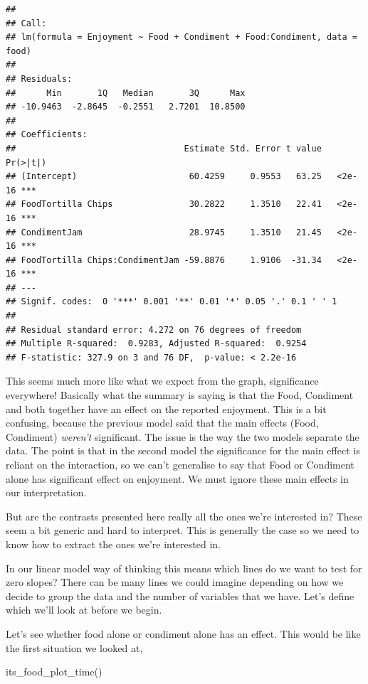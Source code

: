 \documentclass[
]{book}
\newenvironment{Shaded}{\begin{snugshade}}{\end{snugshade}}
\newcommand{\FunctionTok}[1]{\textcolor[rgb]{0.00,0.00,0.00}{#1}}
\newcommand{\NormalTok}[1]{#1}
\begin{document}
\begin{verbatim}
## 
## Call:
## lm(formula = Enjoyment ~ Food + Condiment + Food:Condiment, data = food)
## 
## Residuals:
##      Min       1Q   Median       3Q      Max 
## -10.9463  -2.8645  -0.2551   2.7201  10.8500 
## 
## Coefficients:
##                                 Estimate Std. Error t value Pr(>|t|)    
## (Intercept)                      60.4259     0.9553   63.25   <2e-16 ***
## FoodTortilla Chips               30.2822     1.3510   22.41   <2e-16 ***
## CondimentJam                     28.9745     1.3510   21.45   <2e-16 ***
## FoodTortilla Chips:CondimentJam -59.8876     1.9106  -31.34   <2e-16 ***
## ---
## Signif. codes:  0 '***' 0.001 '**' 0.01 '*' 0.05 '.' 0.1 ' ' 1
## 
## Residual standard error: 4.272 on 76 degrees of freedom
## Multiple R-squared:  0.9283,	Adjusted R-squared:  0.9254 
## F-statistic: 327.9 on 3 and 76 DF,  p-value: < 2.2e-16
\end{verbatim}

This seems much more like what we expect from the graph, significance everywhere! Basically what the summary is saying is that the Food, Condiment and both together have an effect on the reported enjoyment. This is a bit confusing, because the previous model said that the main effects (Food, Condiment) \emph{weren't} significant. The issue is the way the two models separate the data. The point is that in the second model the significance for the main effect is reliant on the interaction, so we can't generalise to say that Food or Condiment alone has significant effect on enjoyment. We must ignore these main effects in our interpretation.

But are the contrasts presented here really all the ones we're interested in? These seem a bit generic and hard to interpret. This is generally the case so we need to know how to extract the ones we're interested in.

In our linear model way of thinking this means which lines do we want to test for zero slopes? There can be many lines we could imagine depending on how we decide to group the data and the number of variables that we have. Let's define which we'll look at before we begin.

Let's see whether food alone or condiment alone has an effect. This would be like the first situation we looked at,

\begin{Shaded}
\begin{Highlighting}[]
\FunctionTok{its\_food\_plot\_time}\NormalTok{()}
\end{Highlighting}
\end{Shaded}
\end{document}

